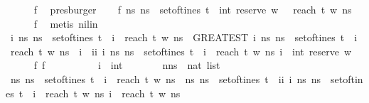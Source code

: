 \begin{isabellebody}
\ \ \ \ \isamarkupfalse%
\ f{}\ \isamarkupfalse%
\ presburger\isanewline
\ \ \isamarkupfalse%
\ f{}{\isacharcolon}\ {\isachardoublequoteopen}{\isasymexists}ns{\isachardot}\ ns\ {\isasymin}\ set{\isacharunderscore}of{\isacharunderscore}tines\ t\ {\isasymand}\ int\ {\isacharparenleft}reserve\ w\ {\isacharbrackleft}{\isacharbrackright}{\isacharparenright}\ {\isacharequal}\ reach\ t\ w\ ns{\isachardoublequoteclose}\isanewline
\ \ \ \ \isamarkupfalse%
\ f{}\ \isamarkupfalse%
\ {\isacharparenleft}metis\ nilin{\isacharparenright}\isanewline
\ \ \isamarkupfalse%
\ {\isachardoublequoteopen}{\isasymAnd}i{\isachardot}\ {\isacharparenleft}{\isasymforall}ns{\isachardot}\ ns\ {\isasymnotin}\ set{\isacharunderscore}of{\isacharunderscore}tines\ t\ {\isasymor}\ i\ {\isasymnoteq}\ reach\ t\ w\ ns{\isacharparenright}\ {\isasymor}\ {\isacharparenleft}GREATEST\ i{\isachardot}\ {\isasymexists}ns{\isachardot}\ ns\ {\isasymin}\ set{\isacharunderscore}of{\isacharunderscore}tines\ t\ {\isasymand}\ i\ {\isacharequal}\ reach\ t\ w\ ns{\isacharparenright}\ {\isacharequal}\ i\ {\isasymor}\ ii\ {\isacharparenleft}{\isasymlambda}i{\isachardot}\ {\isasymexists}ns{\isachardot}\ ns\ {\isasymin}\ set{\isacharunderscore}of{\isacharunderscore}tines\ t\ {\isasymand}\ i\ {\isacharequal}\ reach\ t\ w\ ns{\isacharparenright}\ i\ {\isacharequal}\ int\ {\isacharparenleft}reserve\ w\ {\isacharbrackleft}{\isacharbrackright}{\isacharparenright}{\isachardoublequoteclose}\isanewline
\ \ \ \ \isamarkupfalse%
\ f{}\ f{}\isanewline
\ \ \isamarkupfalse%
\ {\isacharminus}\isanewline
\ \ \ \ \isamarkupfalse%
\ i\ {\isacharcolon}{\isacharcolon}\ int\isanewline
\ \ \ \ \isacommand{{\isacharbraceleft}}\isamarkupfalse%
\ \isamarkupfalse%
\ nns\ {\isacharcolon}{\isacharcolon}\ {\isachardoublequoteopen}nat\ list{\isachardoublequoteclose}\isanewline
\ \ \ \ \ \ \isacommand{{\isacharbraceleft}}\isamarkupfalse%
\ \isamarkupfalse%
\ {\isachardoublequoteopen}{\isacharparenleft}{\isasymexists}ns{\isachardot}\ ns\ {\isasymin}\ set{\isacharunderscore}of{\isacharunderscore}tines\ t\ {\isasymand}\ i\ {\isacharequal}\ reach\ t\ w\ ns{\isacharparenright}\ {\isasymand}\ {\isacharparenleft}{\isasymforall}ns{\isachardot}\ ns\ {\isasymnotin}\ set{\isacharunderscore}of{\isacharunderscore}tines\ t\ {\isasymor}\ ii\ {\isacharparenleft}{\isasymlambda}i{\isachardot}\ {\isasymexists}ns{\isachardot}\ ns\ {\isasymin}\ set{\isacharunderscore}of{\isacharunderscore}tines\ t\ {\isasymand}\ i\ {\isacharequal}\ reach\ t\ w\ ns{\isacharparenright}\ i\ {\isasymnoteq}\ reach\ t\ w\ ns{\isacharparenright}{\isachardoublequoteclose}\isanewline

\end{isabellebody}
